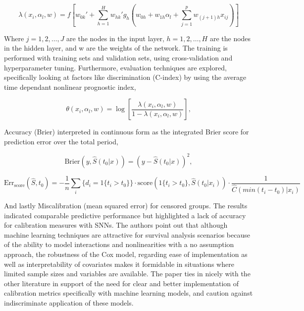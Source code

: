 \begin{equation} \label{eq:snnhazard}\lambda(x_i, \alpha_l, w) = f \left[ w_{0k}' + \sum_{h=1}^{H} w_{hk}' g_h  \left( w_{0h} + w_{1h} \alpha_l + \sum_{j=1}^{p} w_{(j+1)h} x_{ij} \right)  \right]\end{equation}

\noindent Where \(j = 1, 2, \dots , J\) are the nodes in the input layer, \(h = 1, 2, \dots , H\) are the nodes in the hidden layer, and w are the weights of the network. The training is performed with training sets and validation sets, using cross-validation and hyperparameter tuning. Furthermore, evaluation techniques are explored, specifically looking at factors like discrimination (C-index) by using the average time dependant nonlinear prognostic index,

\begin{equation} \label{eq:progindex}\theta(x_i, \alpha_l, w) = \log \left[ \frac{\lambda(x_i, \alpha_l, w)}{1 - \lambda(x_i, \alpha_l, w)} \right],\end{equation}

\noindent Accuracy (Brier) interpreted in continuous form as the integrated Brier score for prediction error over the total period,

\begin{equation} \label{eq:brier}\text{Brier}(y, \hat{S}(t_0 | x)) = (y - \hat{S}(t_0 | x))^2,\end{equation}

\begin{equation} \label{eq:briererr}\text{Err}_{\text{score}} (\hat{S}, t_0) = -\frac{1}{n} \sum_{i} \{d_i = 1\{t_i > t_0\}\} \cdot \text{score}(1\{t_i > t_0\}, \hat{S}(t_0 | x_i)) \cdot \frac{1}{\hat{C}(min(t_i - t_0) | x_i)}\end{equation}

\noindent And lastly Miscalibration (mean squared error) for censored groups. \parencite{kantidakis_simulation_2021} The results indicated comparable predictive performance but highlighted a lack of accuracy for calibration measures with SNNs. The authors point out that although machine learning techniques are attractive for survival analysis scenarios because of the ability to model interactions and nonlinearities with a no assumption approach, the robustness of the Cox model, regarding ease of implementation as well as interpretability of covariates makes it formidable in situations where limited sample sizes and variables are available. The paper ties in nicely with the other literature in support of the need for clear and better implementation of calibration metrics specifically with machine learning models, and caution against indiscriminate application of these models.


